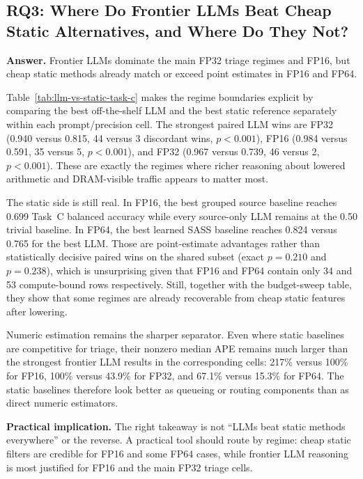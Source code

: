\subsection{RQ3: Where Do Frontier LLMs Beat Cheap Static Alternatives, and Where Do They Not?}

\textbf{Answer.}
Frontier LLMs dominate the main FP32 triage regimes and \sourcesass FP16, but cheap static methods already match or exceed point estimates in \sourceonly FP16 and \sourcesass FP64.



Table~\ref{tab:llm-vs-static-task-c} makes the regime boundaries explicit by comparing the best off-the-shelf LLM and the best static reference separately within each prompt/precision cell.
The strongest paired LLM wins are \sourceonly FP32 (0.940 versus 0.815, 44 versus 3 discordant wins, $p<0.001$), \sourcesass FP16 (0.984 versus 0.591, 35 versus 5, $p<0.001$), and \sourcesass FP32 (0.967 versus 0.739, 46 versus 2, $p<0.001$).
These are exactly the regimes where richer reasoning about lowered arithmetic and DRAM-visible traffic appears to matter most.

The static side is still real.
In \sourceonly FP16, the best grouped source baseline reaches 0.699 Task~C balanced accuracy while every source-only LLM remains at the 0.50 trivial baseline.
In \sourcesass FP64, the best learned SASS baseline reaches 0.824 versus 0.765 for the best LLM.
Those are point-estimate advantages rather than statistically decisive paired wins on the shared subset (exact $p=0.210$ and $p=0.238$), which is unsurprising given that FP16 and FP64 contain only 34 and 53 compute-bound rows respectively.
Still, together with the budget-sweep table, they show that some regimes are already recoverable from cheap static features after lowering.

Numeric \rai estimation remains the sharper separator.
Even where static baselines are competitive for triage, their nonzero median APE remains much larger than the strongest frontier LLM results in the corresponding cells:
217\% versus 100\% for \sourceonly FP16, 100\% versus 43.9\% for \sourceonly FP32, and 67.1\% versus 15.3\% for \sourcesass FP64.
The static baselines therefore look better as queueing or routing components than as direct numeric \rai estimators.

\textbf{Practical implication.}
The right takeaway is not ``LLMs beat static methods everywhere'' or the reverse.
A practical tool should route by regime:
cheap static filters are credible for \sourceonly FP16 and some \sourcesass FP64 cases, while frontier LLM reasoning is most justified for \sourcesass FP16 and the main FP32 triage cells.

